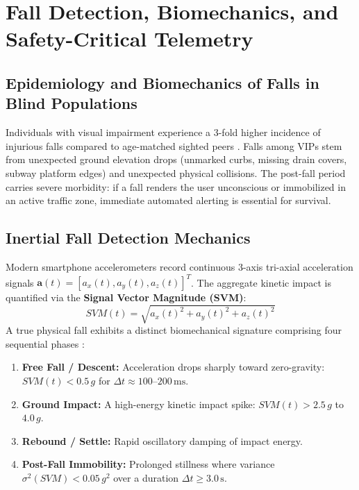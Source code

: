 \documentclass[10pt,twocolumn]{article}
\begin{document}
\section{Fall Detection, Biomechanics, and Safety-Critical Telemetry}
\label{sec:falls}

\subsection{Epidemiology and Biomechanics of Falls in Blind Populations}
Individuals with visual impairment experience a 3-fold higher incidence of injurious falls compared to age-matched sighted peers \cite{marquez2019impact}. Falls among VIPs stem from unexpected ground elevation drops (unmarked curbs, missing drain covers, subway platform edges) and unexpected physical collisions. The post-fall period carries severe morbidity: if a fall renders the user unconscious or immobilized in an active traffic zone, immediate automated alerting is essential for survival.

\subsection{Inertial Fall Detection Mechanics}
Modern smartphone accelerometers record continuous 3-axis tri-axial acceleration signals $\mathbf{a}(t) = [a_x(t), a_y(t), a_z(t)]^T$. The aggregate kinetic impact is quantified via the \textbf{Signal Vector Magnitude (SVM)}:
\begin{equation}
    SVM(t) = \sqrt{a_x(t)^2 + a_y(t)^2 + a_z(t)^2}
\end{equation}
A true physical fall exhibits a distinct biomechanical signature comprising four sequential phases \cite{bourke2007evaluation}:
\begin{enumerate}[leftmargin=*]
    \item \textbf{Free Fall / Descent:} Acceleration drops sharply toward zero-gravity: $SVM(t) < 0.5\,g$ for $\Delta t \approx 100$--$200\,\text{ms}$.
    \item \textbf{Ground Impact:} A high-energy kinetic impact spike: $SVM(t) > 2.5\,g$ to $4.0\,g$.
    \item \textbf{Rebound / Settle:} Rapid oscillatory damping of impact energy.
    \item \textbf{Post-Fall Immobility:} Prolonged stillness where variance $\sigma^2(SVM) < 0.05\,g^2$ over a duration $\Delta t \ge 3.0\,\text{s}$.
\end{enumerate}
\end{document}
